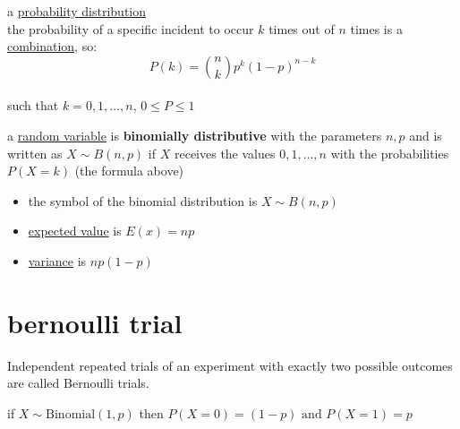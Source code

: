 \documentclass[a4paper,12pt]{article}
\newcommand{\?}{\stackrel{?}{=}}
\begin{document}
\newenvironment{note}
  {\begin{bclogo}[logo=\bcinfo, couleurBarre=orange, couleur=lightgray]{ note}}
  {\end{bclogo}}
\newenvironment{attention}
  {\begin{bclogo}[logo=\bcattention, couleurBarre=red, noborder=true, 
                couleur=red!15]{Important!}}
  {\end{bclogo}}

a \href{20230120140123-probability_distribution.org}{probability distribution}\\[0pt]
the probability of a specific incident to occur \(k\) times out of \(n\) times is a \href{20221204105120-combinatorics.org}{combination}, so:\\[0pt]
\[
  P(k) = \binom{n}{k}p^k{(1-p)}^{n-k}
\]\\[0pt]
such that \(k=0,1,\dots,n\), \(0 \le P \le 1\)\\[0pt]
\begin{definition}
a \href{20230104221353-random_variable.org}{random variable} is \textbf{binomially distributive} with the parameters \(n,p\) and is written as \(X \sim B(n,p)\) if \(X\) receives the values \(0,1,\dots,n\) with the probabilities \(P(X=k)\) (the formula above)\\[0pt]
\end{definition}
\begin{characteristic}
\begin{itemize}
\item the symbol of the binomial distribution is \(X \sim B(n,p)\)\\[0pt]
\item \href{20230121184721-expected_value.org}{expected value} is \(E(x)=np\)\\[0pt]
\item \href{20230113164748-variance.org}{variance} is \(np(1-p)\)\\[0pt]
\end{itemize}
\end{characteristic}
\section{bernoulli trial}
\label{sec:org2adb079}
\begin{definition}
Independent repeated trials of an experiment with exactly two possible outcomes are called Bernoulli trials.\\[0pt]
\begin{characteristic}
if \(X \sim \mathrm{Binomial}(1, p)\) then \(P(X = 0) = (1 - p) \text{ and } P(X = 1) = p\)\\[0pt]
\end{characteristic}
\end{definition}
\end{document}

